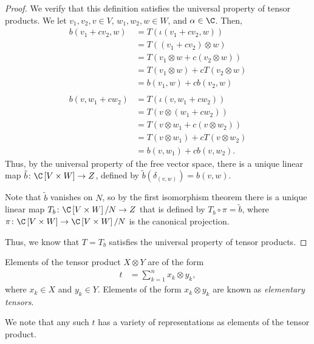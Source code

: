 \begin{proof}
  We verify that this definition satisfies the universal property of tensor products. We let $v_1,v_2,v\in V$, $w_1,w_2,w\in W$, and $\alpha\in \C$. Then,
  \begin{align*}
    b\left( v_1 + cv_2,w \right) &= T\left( \iota\left( v_1 + cv_2,w \right) \right)\\
                                 &= T\left( \left( v_1 + cv_2 \right)\otimes w \right)\\
                                 &= T\left( v_1\otimes w + c\left( v_2\otimes w \right) \right)\\
                                 &= T\left( v_1\otimes w \right) + cT\left( v_2\otimes w \right)\\
                                 &= b\left( v_1,w \right) + cb\left( v_2,w \right)\\
                                 \\
    b\left( v,w_1 + cw_2 \right) &= T\left( \iota\left( v,w_1 + cw_2 \right) \right)\\
                                 &= T\left( v\otimes \left( w_1 + cw_2 \right) \right)\\
                                 &= T\left( v\otimes w_1 + c\left( v\otimes w_2 \right) \right)\\
                                 &= T\left( v\otimes w_1 \right) + cT\left( v\otimes w_2 \right)\\
                                 &= b\left( v,w_1 \right) + cb\left( v,w_2 \right).
  \end{align*}
  Thus, by the universal property of the free vector space, there is a unique linear map $\tilde{b}\colon \C\left[ V\times W \right]\rightarrow Z$, defined by $\tilde{b}\left( \delta_{(v,w)} \right) = b\left( v,w \right)$.\newline

  Note that $\tilde{b}$ vanishes on $N$, so by the first isomorphism theorem there is a unique linear map $T_{b}\colon \C\left[ V\times W \right]/N\rightarrow Z$ that is defined by $T_{b} \circ \pi = \tilde{b}$, where $\pi\colon \C\left[ V\times W \right] \rightarrow \C\left[ V\times W \right]/N$ is the canonical projection.\newline

  Thus, we know that $T = T_{b}$ satisfies the universal property of tensor products.
\end{proof}
\begin{remark}
  Elements of the tensor product $X\otimes Y$ are of the form
  \begin{align*}
    t &= \sum_{k=1}^{n}x_k\otimes y_k,
  \end{align*}
  where $x_k\in X$ and $y_k\in Y$. Elements of the form $x_k\otimes y_k$ are known as \textit{elementary tensors}.\newline

  We note that any such $t$ has a variety of representations as elements of the tensor product.
\end{remark}
